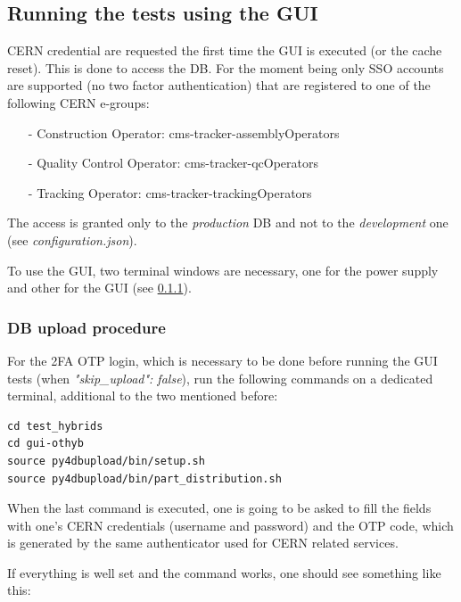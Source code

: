 \documentclass[10pt,a4paper]{article}
\begin{document}
\subsection{Running the tests using the GUI}

CERN credential are requested the first time the GUI is executed (or the cache reset). This is done to access the DB. For the moment being only SSO accounts are supported (no two factor authentication) that are registered to one of the following CERN e-groups:
\begin{itemize}
\item[-] Construction Operator: cms-tracker-assemblyOperators
\item[-] Quality Control Operator: cms-tracker-qcOperators
\item[-] Tracking Operator: cms-tracker-trackingOperators
\end{itemize}
The access is granted only to the {\it production} DB and not to the {\it development} one (see \emph{configuration.json}). 

To use the GUI, two terminal windows are necessary, one for the power supply and other for the GUI (see \ref{DBup}).

\subsubsection{DB upload procedure}
\label{DBup}

For the 2FA OTP login, which is necessary to be done before running the GUI tests (when \emph{"skip\_upload": false}), run the following commands on a dedicated terminal, additional to the two mentioned before:

\begin{framed}
\begin{verbatim}
cd test_hybrids
cd gui-othyb
source py4dbupload/bin/setup.sh
source py4dbupload/bin/part_distribution.sh
\end{verbatim}
\end{framed}

When the last command is executed, one is going to be asked to fill the fields with one's CERN credentials (username and password) and the OTP code, which is generated by the same authenticator used for CERN related services. 

If everything is well set and the command works, one should see something like this: 
\end{document}

